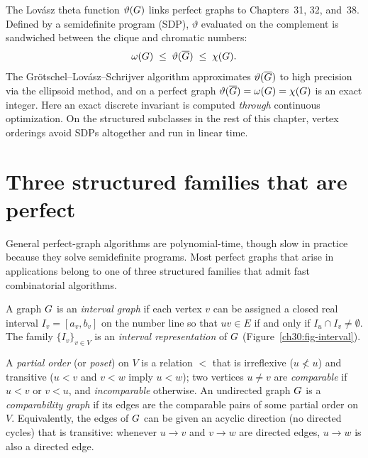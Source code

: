 \begin{connectionbox}
The Lov\'asz theta function $\vartheta(G)$ links perfect graphs to Chapters~31, 32, and~38. Defined by a semidefinite program (SDP), $\vartheta$ evaluated on the complement is sandwiched between the clique and chromatic numbers:
\[
  \omega(G) \;\le\; \vartheta(\overline{G}) \;\le\; \chi(G).
\]
The Gr\"otschel--Lov\'asz--Schrijver algorithm approximates $\vartheta(\overline{G})$ to high precision via the ellipsoid method, and on a perfect graph $\vartheta(\overline{G})=\omega(G)=\chi(G)$ is an exact integer. Here an exact discrete invariant is computed \emph{through} continuous optimization. On the structured subclasses in the rest of this chapter, vertex orderings avoid SDPs altogether and run in linear time.
\end{connectionbox}

\section{Three structured families that are perfect}

General perfect-graph algorithms are polynomial-time, though slow in practice because they solve semidefinite programs. Most perfect graphs that arise in applications belong to one of three structured families that admit fast combinatorial algorithms.

\begin{definition}\label{ch30:def-interval}
A graph $G$ is an \emph{interval graph} if each vertex $v$ can be assigned a closed real interval $I_v=[a_v,b_v]$ on the number line so that $uv\in E$ if and only if $I_u\cap I_v\neq\emptyset$. The family $\{I_v\}_{v\in V}$ is an \emph{interval representation} of $G$ (Figure~\ref{ch30:fig-interval}).
\end{definition}

\begin{definition}\label{ch30:def-comparability}
A \emph{partial order} (or \emph{poset}) on $V$ is a relation $<$ that is irreflexive ($u\not< u$) and transitive ($u<v$ and $v<w$ imply $u<w$); two vertices $u\neq v$ are \emph{comparable} if $u<v$ or $v<u$, and \emph{incomparable} otherwise. An undirected graph $G$ is a \emph{comparability graph} if its edges are the comparable pairs of some partial order on $V$. Equivalently, the edges of $G$ can be given an acyclic direction (no directed cycles) that is transitive: whenever $u\to v$ and $v\to w$ are directed edges, $u\to w$ is also a directed edge.
\end{definition}

